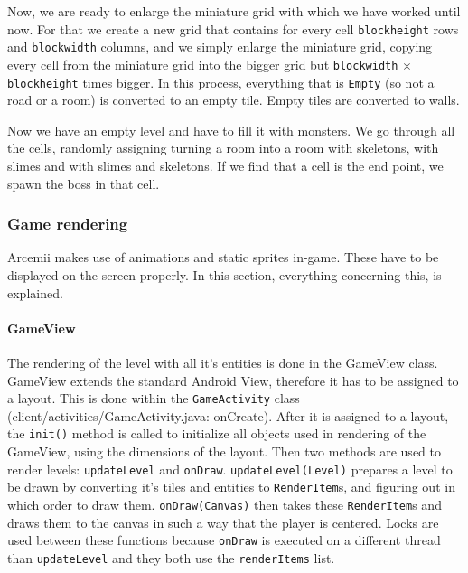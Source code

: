 \documentclass[../main.tex]{subfiles}
\begin{document}
		Now, we are ready to enlarge the miniature grid with which we have worked until now. For that we create a new grid that contains for every cell \texttt{blockheight} rows and \texttt{blockwidth} columns, and we simply enlarge the miniature grid, copying every cell from the miniature grid into the bigger grid but \texttt{blockwidth} $\times$ \texttt{blockheight} times bigger. In this process, everything that is \texttt{Empty} (so not a road or a room) is converted to an empty tile. Empty tiles are converted to walls.
		
			Now we have an empty level and have to fill it with monsters. We go through all the cells, randomly assigning turning a room into a room with skeletons, with slimes and with slimes and skeletons. If we find that a cell is the end point, we spawn the boss in that cell.
		\subsubsection{Game rendering}
		Arcemii makes use of animations and static sprites in-game. These have to be displayed on the screen properly. In this section, everything concerning this, is explained.
        \paragraph{GameView}
        The rendering of the level with all it's entities is done in the GameView class. GameView extends the standard Android View, therefore it has to be assigned to a layout. This is done within the \texttt{GameActivity} class (\tiny client/activities/GameActivity.java: onCreate\normalsize). After it is assigned to a layout, the \texttt{init()} method is called to initialize all objects used in rendering of the GameView, using the dimensions of the layout. Then two methods are used to render levels: \texttt{updateLevel} and \texttt{onDraw}. \texttt{updateLevel(Level)} prepares a level to be drawn by converting it's tiles and entities to \texttt{RenderItem}s, and figuring out in which order to draw them. \texttt{onDraw(Canvas)} then takes these \texttt{RenderItem}s and draws them to the canvas in such a way that the player is centered. Locks are used between these functions because \texttt{onDraw} is executed on a different thread than \texttt{updateLevel} and they both use the \texttt{renderItems} list.
\end{document}

